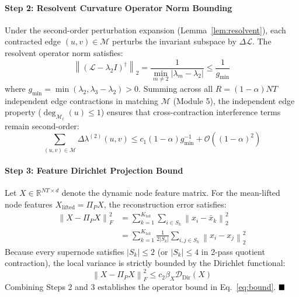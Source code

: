 \documentclass[sigconf]{acmart}
\begin{document}
\paragraph{Step 2: Resolvent Curvature Operator Norm Bounding}
Under the second-order perturbation expansion (Lemma~\ref{lem:resolvent}), each contracted edge $(u, v) \in \mathcal{M}$ perturbs the invariant subspace by $\Delta \mathcal{L}$. The resolvent operator norm satisfies:
\begin{equation}
\label{eq:proof_resolvent}
\left\| \left(\mathcal{L} - \lambda_2 I\right)^\dagger \right\|_2 = \frac{1}{\min_{m \neq 2} |\lambda_m - \lambda_2|} \le \frac{1}{g_{\min}}
\end{equation}
where $g_{\min} = \min(\lambda_2, \lambda_3 - \lambda_2) > 0$.
Summing across all $R = (1 - \alpha) NT$ independent edge contractions in matching $\mathcal{M}$ (Module 5), the independent edge property ($\operatorname{deg}_{\mathcal{M}_t}(u) \le 1$) ensures that cross-contraction interference terms remain second-order:
\begin{equation}
\label{eq:proof_sum}
\sum_{(u, v) \in \mathcal{M}} \Delta \lambda^{(2)}(u, v) \le c_1 (1 - \alpha) g_{\min}^{-1} + \mathcal{O}\left((1 - \alpha)^2\right)
\end{equation}

\paragraph{Step 3: Feature Dirichlet Projection Bound}
Let $X \in \mathbb{R}^{NT \times d}$ denote the dynamic node feature matrix. For the mean-lifted node features $X_{\text{lifted}} = \Pi_P X$, the reconstruction error satisfies:
\begin{equation}
\label{eq:proof_dirichlet}
\begin{split}
\left\| X - \Pi_P X \right\|_F^2 &= \sum_{k=1}^{K_{\text{tot}}} \sum_{i \in S_k} \left\|x_i - \bar{x}_k\right\|_2^2 \\
&= \sum_{k=1}^{K_{\text{tot}}} \frac{1}{2 |S_k|} \sum_{i, j \in S_k} \left\|x_i - x_j\right\|_2^2
\end{split}
\end{equation}
Because every supernode satisfies $|S_k| \le 2$ (or $|S_k| \le 4$ in 2-pass quotient contraction), the local variance is strictly bounded by the Dirichlet functional:
\begin{equation}
\left\| X - \Pi_P X \right\|_F^2 \le c_2 \beta_X \mathcal{D}_{\text{Dir}}(X)
\end{equation}
Combining Steps 2 and 3 establishes the operator bound in Eq.~\eqref{eq:bound}. $\hfill \blacksquare$
\end{document}
